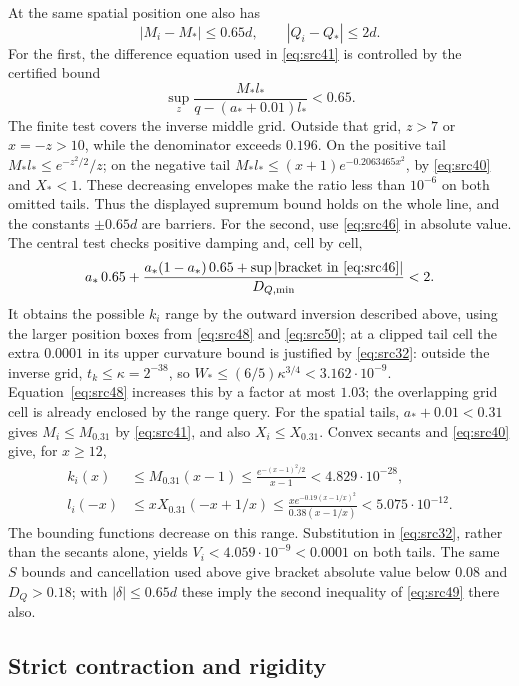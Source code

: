 \documentclass[11pt,a4paper]{article}
\numberwithin{equation}{section}
\theoremstyle{definition}
\theoremstyle{remark}
\begin{document}
At the same spatial position one also has
\begin{equation}
 |M_i-M_*|\le0.65d,\qquad |Q_i-Q_*|\le2d.
 \label{eq:src49}
\end{equation}
For the first, the difference equation used in
\eqref{eq:src41} is controlled by the certified bound
\[
 \sup_z\frac{M_*l_*}{q-(a_*+0.01)l_*}<0.65.
\]
The finite test covers the inverse middle grid.  Outside that grid,
$z>7$ or $x=-z>10$, while the denominator exceeds $0.196$.
On the positive tail $M_*l_*\le e^{-z^2/2}/z$; on the negative tail
$M_*l_*\le(x+1)e^{-0.2063465x^2}$, by \eqref{eq:src40} and $X_*<1$.
These decreasing envelopes make the ratio less than $10^{-6}$ on
both omitted tails.  Thus the displayed supremum bound holds on the
whole line, and the constants $\pm0.65d$ are barriers.  For the second, use
\eqref{eq:src46} in absolute value.  The central test checks positive
damping and, cell by cell,
\[
 a_*\,0.65+
 \frac{a_*(1-a_*)\,0.65+\sup|\text{bracket in \eqref{eq:src46}}|}
      {D_{Q,\min}}<2.
\]
It obtains the possible $k_i$ range by the outward inversion described
above, using the larger position boxes from \eqref{eq:src48} and
\eqref{eq:src50}; at a
clipped tail cell the extra $0.0001$ in its upper curvature bound is
justified by \eqref{eq:src32}: outside the inverse grid,
$t_k\le\kappa=2^{-38}$, so
$W_*\le(6/5)\kappa^{3/4}<3.162\cdot10^{-9}$.
Equation~\eqref{eq:src48} increases this by a factor at most $1.03$;
the overlapping grid cell is already enclosed by the range query.
For the spatial tails, $a_*+0.01<0.31$ gives $M_i\le M_{0.31}$
by \eqref{eq:src41}, and also $X_i\le X_{0.31}$.
Convex secants and \eqref{eq:src40} give, for $x\ge12$,
\[
 \begin{split}
 k_i(x)&\le M_{0.31}(x-1)
       \le\frac{e^{-(x-1)^2/2}}{x-1}<4.829\cdot10^{-28},\\
 l_i(-x)&\le xX_{0.31}(-x+1/x)
       \le\frac{x e^{-0.19(x-1/x)^2}}{0.38(x-1/x)}
       <5.075\cdot10^{-12}.
 \end{split}
\]
The bounding functions decrease on this range.  Substitution in
\eqref{eq:src32}, rather than the secants alone, yields
$V_i<4.059\cdot10^{-9}<0.0001$ on both tails.
The same $S$ bounds
and cancellation used above give bracket absolute value below
$0.08$ and $D_Q>0.18$; with $|\delta|\le0.65d$ these imply the
second inequality of \eqref{eq:src49} there also.

\subsection{Strict contraction and rigidity}
\end{document}
